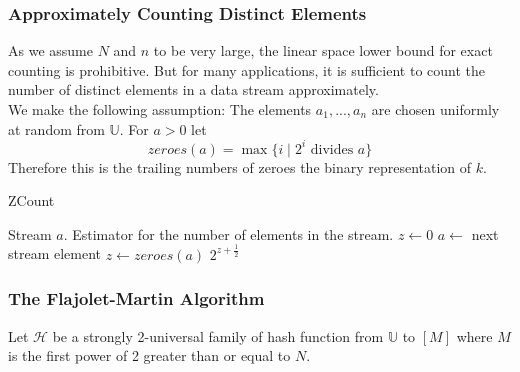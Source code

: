 \documentclass[english]{panikzettel}
\begin{document}
\subsubsection{Approximately Counting Distinct Elements}
As we assume $N$ and $n$ to be very large, the linear space lower bound for exact counting is prohibitive. But for many applications, it is sufficient to count the number of distinct elements in a data stream approximately.\\
We make the following assumption:
The elements $a_1,...,a_n$ are chosen uniformly at random from $\mathbb{U}$. For $a>0$ let
\[
zeroes(a)=\max \{i \mid 2^i \text{ divides } a \}
\]
Therefore this is the trailing numbers of zeroes the binary representation of $k$.

\begin{algo}{ZCount}
{
\renewcommand{\algorithmicrequire}{\textbf{Input:}}
\renewcommand{\algorithmicensure}{\textbf{Output:}}
  \begin{algorithmic}[1]
  \Require Stream $a$.
  \Ensure Estimator for the number of elements in the stream.
  \State $z\leftarrow 0$
  	\State $a\leftarrow$ next stream element
    \State $z\leftarrow zeroes(a)$
    \EndIf
  \EndWhile
  \State \Return $2^{z+\frac{1}{2}}$ 
  \end{algorithmic}
}
\end{algo}

\subsubsection{The Flajolet-Martin Algorithm}
Let $\mathcal{H}$ be a strongly 2-universal family of hash function from $\mathbb{U}$ to $[M]$ where $M$ is the first power of 2 greater than or equal to $N$.
\end{document}
